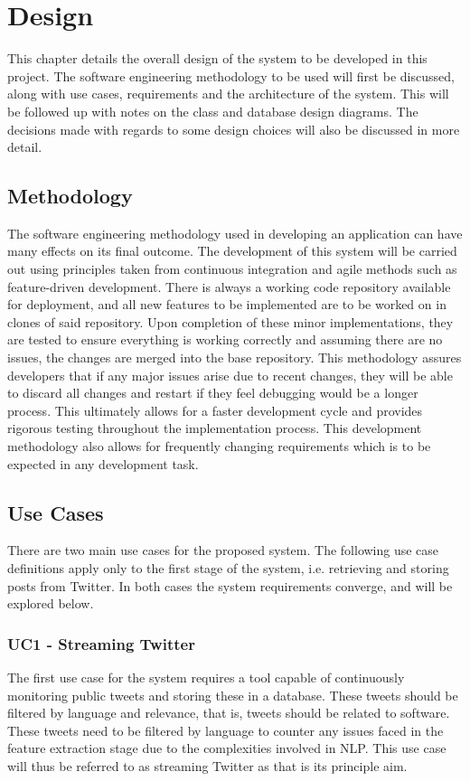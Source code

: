 \chapter{Design}
\label{cha:design}
This chapter details the overall design of the system to be developed in this project. The software engineering methodology to be used will first be discussed, along with use cases, requirements and the architecture of the system. This will be followed up with notes on the class and database design diagrams. The decisions made with regards to some design choices will also be discussed in more detail.

\section{Methodology}
The software engineering methodology used in developing an application can have many effects on its final outcome. The development of this system will be carried out using principles taken from continuous integration and agile methods such as feature-driven development. There is always a working code repository available for deployment, and all new features to be implemented are to be worked on in clones of said repository. Upon completion of these minor implementations, they are tested to ensure everything is working correctly and assuming there are no issues, the changes are merged into the base repository. This methodology assures developers that if any major issues arise due to recent changes, they will be able to discard all changes and restart if they feel debugging would be a longer process. This ultimately allows for a faster development cycle and provides rigorous testing throughout the implementation process. This development methodology also allows for frequently changing requirements which is to be expected in any development task.

\section{Use Cases}
There are two main use cases for the proposed system. The following use case definitions apply only to the first stage of the system, i.e. retrieving and storing posts from Twitter. In both cases the system requirements converge, and will be explored below.

\subsection[Use Case 1]{UC1 - Streaming Twitter}
The first use case for the system requires a tool capable of continuously monitoring public tweets and storing these in a database. These tweets should be filtered by language and relevance, that is, tweets should be related to software. These tweets need to be filtered by language to counter any issues faced in the feature extraction stage due to the complexities involved in NLP. This use case will thus be referred to as streaming Twitter as that is its principle aim.

